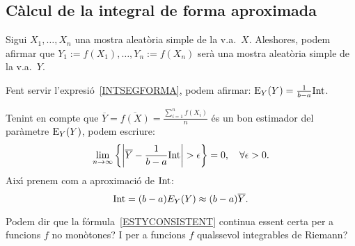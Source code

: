\subsection*{C\`alcul de la integral de forma aproximada}

Sigui $X_1,\ldots,X_n$ una mostra aleat\`oria
 simple de la v.a.~$X$.
Aleshores, podem afirmar que $Y_1:= f(X_1),\ldots,Y_n:= f(X_n)$ ser\`a una mostra
aleat\`oria simple de la v.a.~$Y$.

Fent servir l'expresi\'o~\ref{INTSEGFORMA}, podem afirmar: 
${\rm E}_Y (Y) =\frac{1}{b-a} {\rm Int}$.

Tenint en compte que $\overline{Y}=\overline{f(X)}=
\frac{\sum\limits_{i=1}^n f(X_i)}{n}$ \'es un bon estimador
 del par\`ametre ${\rm E}_Y(Y)$, 
podem escriure:
\begin{equation}
\lim_{n\to\infty} \left\{\left|\overline{Y}-\frac{1}{b-a} {\rm Int}\right|
> \epsilon\right\} =0,\quad\forall\epsilon >0.
\label{ESTYCONSISTENT}
\end{equation}
Aix\'{\i} prenem com a aproximaci\'o de ${\rm Int}$:
\[
{\rm Int} = (b-a) E_Y (Y)\approx (b-a)\overline{Y}.
\]

Podem dir que la f\'ormula~\ref{ESTYCONSISTENT} continua essent certa 
per a funcions $f$ no mon\`otones? I per a funcions $f$ qualssevol integrables de
Riemann?


